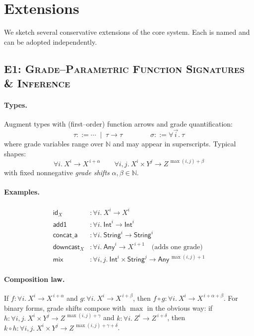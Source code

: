 \section{Extensions}
\label{sec:extensions}

We sketch several conservative extensions of the core system. Each is named and can be adopted independently.

\subsection{\textsc{E1: Grade–Parametric Function Signatures \& Inference}}
\paragraph{Types.}
Augment types with (first–order) function arrows and grade quantification:
\[
\tau ::= \cdots \;\mid\; \tau \to \tau 
\qquad\qquad
\sigma ::= \forall \vec{i}.\ \tau
\]
where grade variables range over $\mathbb{N}$ and may appear in superscripts.
Typical shapes:
\[
\forall i.\ X^{i} \to X^{\,i+\alpha}
\qquad
\forall i,j.\ X^{i}\times Y^{j} \to Z^{\,\max(i,j)+\beta}
\]
with fixed nonnegative \emph{grade shifts} $\alpha,\beta \in \mathbb{N}$.

\paragraph{Examples.}
\begin{align*}
\textsf{id}_X &: \forall i.\ X^{i} \to X^{i} 
\\
\textsf{add1} &: \forall i.\ \textsf{Int}^{i} \to \textsf{Int}^{i}
\\
\textsf{concat\_a} &: \forall i.\ \textsf{String}^{i} \to \textsf{String}^{i}
\\
\textsf{downcast}_X &: \forall i.\ \textsf{Any}^{i} \to X^{\,i+1} \quad\text{(adds one grade)}
\\
\textsf{mix} &: \forall i,j.\ \textsf{Int}^{i}\times \textsf{String}^{j} \to \textsf{Any}^{\,\max(i,j)+1}
\end{align*}

\paragraph{Composition law.}
If $f:\forall i.\ X^{i}\!\to\! X^{\,i+\alpha}$ and $g:\forall i.\ X^{i}\!\to\! X^{\,i+\beta}$,
then $f\circ g:\forall i.\ X^{i}\!\to\! X^{\,i+\alpha+\beta}$.
For binary forms, grade shifts compose with $\max$ in the obvious way:
if $h:\forall i,j.\ X^{i}\times Y^{j}\to Z^{\,\max(i,j)+\gamma}$ and
$k:\forall i.\ Z^{i}\to Z^{\,i+\delta}$, then
$k\circ h:\forall i,j.\ X^{i}\times Y^{j}\to Z^{\,\max(i,j)+\gamma+\delta}$.

